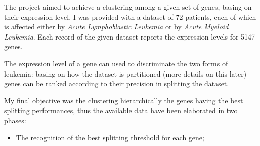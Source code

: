 The project aimed to achieve a clustering among a given set of genes,
basing on their expression level. I was provided with a dataset of 72
patients, each of which is affected either by \emph{Acute Lymphoblastic
Leukemia} or by \emph{Acute Myeloid Leukemia}. Each record of the given
dataset reports the expression levels for 5147 genes.

The expression level of a gene can used to discriminate the two forms of
leukemia: basing on how the dataset is partitioned (more details on this
later) genes can be ranked according to their precision in splitting the
dataset.

My final objective was the clustering hierarchically the genes having the
best splitting performances, thus the available data have been elaborated
in two phases:
\begin{itemize}
\item   The recognition of the best splitting threshold for each gene;
\end{itemize}


